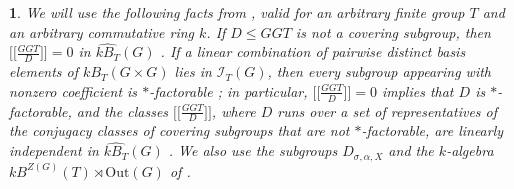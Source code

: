 \documentclass[12pt]{article}
\theoremstyle{change}
\newtheorem{nothing}[theorem]{}
\renewcommand{\le}{\leqslant} %
\newcommand{\calI}{\mathcal{I}}
\newcommand{\Out}{\mathrm{Out}}
\newcommand{\1}{{\bf 1}}
\begin{document}
\begin{nothing}\label{not: romero-generalT}
We will use the following facts from \cite{R1}, valid for an arbitrary finite group $T$ and an arbitrary commutative ring $k$. If $D\le GGT$ is not a covering subgroup, then $\bigl[\bigl[\tfrac{GGT}{D}\bigr]\bigr]=0$ in $\widehat{kB_T}(G)$ \cite{R1}. If a linear combination of pairwise distinct basis elements of $kB_T(G\times G)$ lies in $\calI_T(G)$, then every subgroup appearing with nonzero coefficient is $\ast$-factorable \cite[Lemma 3.2]{R1}; in particular, $\bigl[\bigl[\tfrac{GGT}{D}\bigr]\bigr]=0$ implies that $D$ is $\ast$-factorable, and the classes $\bigl[\bigl[\tfrac{GGT}{D}\bigr]\bigr]$, where $D$ runs over a set of representatives of the conjugacy classes of covering subgroups that are not $\ast$-factorable, are linearly independent in $\widehat{kB_T}(G)$ \cite{R1}. We also use the subgroups $D_{\sigma,\alpha,X}$ and the $k$-algebra $kB^{Z(G)}(T)\rtimes\Out(G)$ of \cite[Section 3]{R1}.
\end{nothing}
\end{document}
